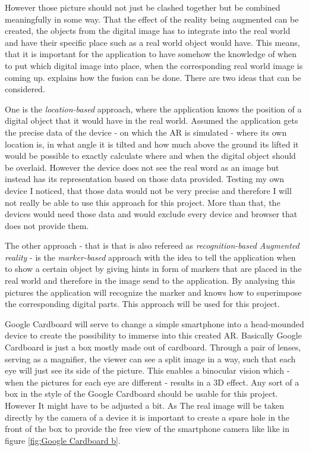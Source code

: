 However those picture should not just be clashed together but be combined meaningfully in some way. That the effect of the reality being augmented can be created, the objects from the digital image has to integrate into the real world and have their specific place such as a real world object would have. This means, that it is important for the application to have somehow the knowledge of when to put which digital image into place, when the corresponding real world image is coming up. \cite{Kumar2017HowQuora} explains how the fusion can be done. There are two ideas that can be considered. 

One is the \textit{location-based} approach, where the application knows the position of a digital object that it would have in the real world. Assumed the application gets the precise data of the device - on which the AR is simulated - where its own location is, in what angle it is tilted and how much above the ground its lifted it would be possible to exactly calculate where and when the digital object should be overlaid. However the device does not see the real word as an image but instead has its representation based on those data provided. Testing my own device I noticed, that those data would not be very precise and therefore I will not really be able to use this approach for this project. More than that, the devices would need those data and would exclude every device and browser that does not provide them.

The other approach - that is that is also refereed as \textit{recognition-based Augmented reality} - is the \textit{marker-based} approach with the idea to tell the application when to show a certain object by giving hints in form of markers that are placed in the real world and therefore in the image send to the application. By analysing this pictures the application will recognize the marker and knows how to superimpose the corresponding digital parts. This approach will be used for this project.

Google Cardboard will serve to change a simple smartphone into a head-mounded device to create the possibility to immerse into this created AR. 
Basically Google Cardboard is just a box mostly made out of cardboard. Through a pair of lenses, serving as a magnifier, the viewer can see a split image in a way, such that each eye will just see its side of the picture. This enables a binocular vision which - when the pictures for each eye are different - results in a 3D effect. 
Any sort of a box in the style of the Google Cardboard should be usable for this project. However It might have to be adjusted a bit. As The real image will be taken directly by the camera of a device it is important to create a spare hole in the front of the box to provide the free view of the smartphone camera like like in figure \ref{fig:Google Cardboard b}.


